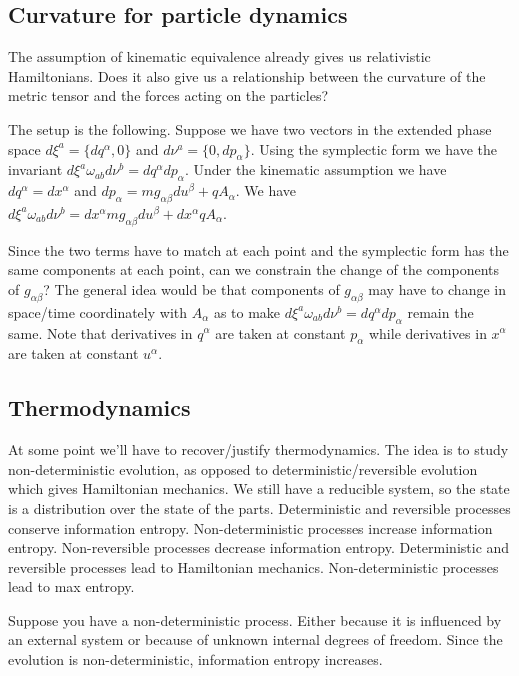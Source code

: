 \documentclass[11pt,letterpaper,fleqn]{memoir} %
\begin{document}
\subsection{Curvature for particle dynamics}

The assumption of kinematic equivalence already gives us relativistic Hamiltonians. Does it also give us a relationship between the curvature of the metric tensor and the forces acting on the particles?

The setup is the following. Suppose we have two vectors in the extended phase space $d\xi^a = \{dq^\alpha, 0\}$ and $d\nu^a = \{0, dp_\alpha\}$. Using the symplectic form we have the invariant $d\xi^a \omega_{ab}d\nu^b = dq^\alpha dp_\alpha$. Under the kinematic assumption we have $dq^\alpha = dx^\alpha$ and $dp_\alpha = mg_{\alpha\beta}du^\beta + q A_\alpha$. We have $d\xi^a \omega_{ab}d\nu^b = dx^\alpha m g_{\alpha\beta} du^\beta + dx^\alpha q A_\alpha$.

Since the two terms have to match at each point and the symplectic form has the same components at each point, can we constrain the change of the components of $g_{\alpha\beta}$? The general idea would be that components of $g_{\alpha\beta}$ may have to change in space/time coordinately with $A_\alpha$ as to make $d\xi^a \omega_{ab}d\nu^b = dq^\alpha dp_\alpha$ remain the same. Note that derivatives in $q^\alpha$ are taken at constant $p_\alpha$ while derivatives in $x^\alpha$ are taken at constant $u^\alpha$.

\subsection{Thermodynamics}

At some point we'll have to recover/justify thermodynamics. The idea is to study non-deterministic evolution, as opposed to deterministic/reversible evolution which gives Hamiltonian mechanics. We still have a reducible system, so the state is a distribution over the state of the parts. Deterministic and reversible processes conserve information entropy. Non-deterministic processes increase information entropy. Non-reversible processes decrease information entropy. Deterministic and reversible processes lead to Hamiltonian mechanics. Non-deterministic processes lead to max entropy.

Suppose you have a non-deterministic process. Either because it is influenced by an external system or because of unknown internal degrees of freedom. Since the evolution is non-deterministic, information entropy increases.
\end{document}
